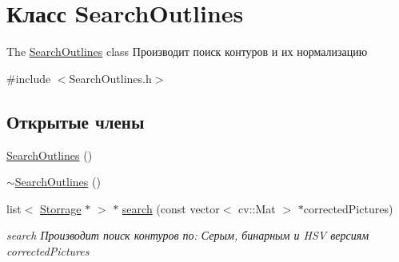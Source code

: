 \hypertarget{class_search_outlines}{\section{Класс Search\+Outlines}
\label{class_search_outlines}
}


The \hyperlink{class_search_outlines}{Search\+Outlines} class Производит поиск контуров и их нормализацию  




{\ttfamily \#include $<$Search\+Outlines.\+h$>$}

\subsection*{Открытые члены}
\begin{DoxyCompactItemize}
\item 
\hyperlink{class_search_outlines_a3c7f09def73a9521a0735d8e90a79a94}{Search\+Outlines} ()
\item 
\hyperlink{class_search_outlines_ac75a5dc3628e9970b538b9636bec3599}{$\sim$\+Search\+Outlines} ()
\item 
list$<$ \hyperlink{class_storrage}{Storrage} $\ast$ $>$ $\ast$ \hyperlink{class_search_outlines_af38a752797a850533995230928187e32}{search} (const vector$<$ cv\+::\+Mat $>$ $\ast$corrected\+Pictures)
\begin{DoxyCompactList}\small\item\em search Производит поиск контуров по\+: Серым, бинарным и H\+S\+V версиям corrected\+Pictures \end{DoxyCompactList}\end{DoxyCompactItemize}
